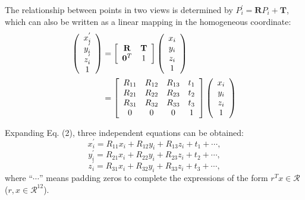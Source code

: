 \begin{questions}
\begin{parts}
\begin{solution}
    The relationship between points in two views is determined by $P_{i}^{'} = \mathbf{R}P_{i} + \mathbf{T}$, which can also be written as a linear mapping in the homogeneous coordinate: 
    \begin{equation}
        \begin{split}
            \left(\begin{array}{c}x_{i}^{'} \\ y_{i}^{'} \\ z_{i}^{'} \\ 1 \\ \end{array} \right) 
            & = \left[ \begin{array} { c c } { \mathbf{R} } & \mathbf{T}  \\ { \mathbf{0}^{T} } & { 1 }  \end{array} \right] \left(\begin{array}{c}x_{i} \\ y_{i} \\ z_{i} \\ 1 \\ \end{array} \right)\\
            & = \left[ \begin{array} { c c c c } {R_{11}} & {R_{12}} & {R_{13}} & { t_{1} } \\ {R_{21}} & {R_{22}} & {R_{23}} & { t_{2} } \\ {R_{31}} & {R_{32}} & {R_{33}} & { t_{3} } \\ {0} & {0} & {0} & {1} \end{array} \right] \left(\begin{array}{c}x_{i} \\ y_{i} \\ z_{i} \\ 1 \\ \end{array} \right)
        \end{split}
    \end{equation}
    
    Expanding Eq. (2), three independent equations can be obtained:
    \[x_{i}^{'} = R_{11} x_{i} + R_{12} y_{i} + R_{13} z_{i} + t_{1} + \cdots,\]
    \[y_{i}^{'} = R_{21} x_{i} + R_{22} y_{i} + R_{23} z_{i} + t_{2} + \cdots,\]
    \[z_{i}^{'} = R_{31} x_{i} + R_{32} y_{i} + R_{33} z_{i} + t_{3} + \cdots,\]
    where \enquote{$\cdots$} means padding zeros to complete the expressions of the form $r^{T} x \in \mathcal{R}$ ($r, x \in \mathcal{R}^{12}$).
    

\end{solution}
\end{parts}
\end{questions}

